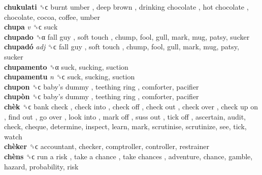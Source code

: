 \textbf{chukulati} ␝ϲ   burnt umber ,  deep brown ,  drinking chocolate ,  hot chocolate , chocolate, cocoa, coffee, umber  \\
\textbf{chupa} \emph{v}  ␝ϲ  suck  \\
\textbf{chupado} ␝α   fall guy ,  soft touch , chump, fool, gull, mark, mug, patsy, sucker  \\
\textbf{chupadó} \emph{adj}  ␝ϲ   fall guy ,  soft touch , chump, fool, gull, mark, mug, patsy, sucker  \\
\textbf{chupamento} ␝α  suck, sucking, suction  \\
\textbf{chupamentu} \emph{n}  ␝ϲ  suck, sucking, suction  \\
\textbf{chupon} ␝ϲ   baby’s dummy ,  teething ring , comforter, pacifier  \\
\textbf{chupòn} ␝ϲ   baby’s dummy ,  teething ring , comforter, pacifier  \\
\textbf{chèk} ␝ϲ   bank check ,  check into ,  check off ,  check out ,  check over ,  check up on ,  find out ,  go over ,  look into ,  mark off ,  suss out ,  tick off , ascertain, audit, check, cheque, determine, inspect, learn, mark, scrutinise, scrutinize, see, tick, watch  \\
\textbf{chèker} ␝ϲ  accountant, checker, comptroller, controller, restrainer  \\
\textbf{chèns} ␝ϲ   run a risk ,  take a chance ,  take chances , adventure, chance, gamble, hazard, probability, risk  \\
